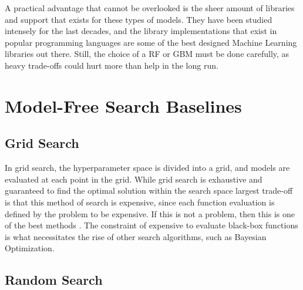 A practical advantage that cannot be overlooked is the sheer amount of libraries and support that exists for these types of models. They have been studied intensely for the last decades, and the library implementations that exist in popular programming languages are some of the best designed Machine Learning libraries out there.  Still, the choice of a RF or GBM must be done carefully, as heavy trade-offs could hurt more than help in the long run. 

\section{Model-Free Search Baselines}


\subsection{Grid Search}

In grid search, the hyperparameter space is divided into a grid, and models are evaluated at each point in the grid. While grid search is exhaustive and guaranteed to find the optimal solution within the search space largest trade-off is that this method of search is expensive, since each function evaluation is defined by the problem to be expensive. If this is not a problem, then this is one of the best methods . The constraint of expensive to evaluate black-box functions is what necessitates the rise of other search algorithms, such as Bayesian Optimization. 

\subsection{Random Search}

